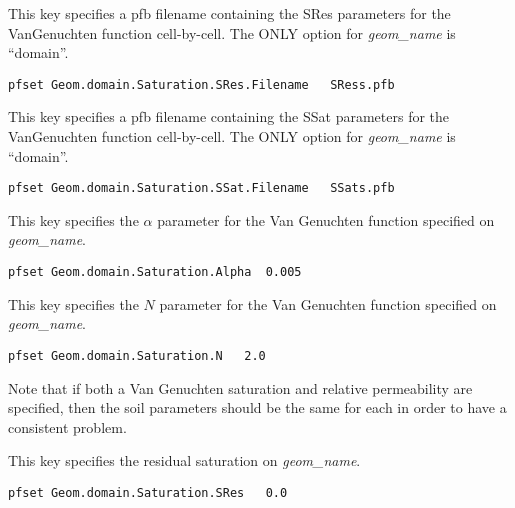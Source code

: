 {This key specifies a pfb filename containing the SRes parameters for the
VanGenuchten function cell-by-cell.  The ONLY option for {\em geom\_name} is
``domain''.}
\begin{display}\begin{verbatim}
pfset Geom.domain.Saturation.SRes.Filename   SRess.pfb
\end{verbatim}\end{display}

{This key specifies a pfb filename containing the SSat parameters for the
VanGenuchten function cell-by-cell.  The ONLY option for {\em geom\_name} is
``domain''.}
\begin{display}\begin{verbatim}
pfset Geom.domain.Saturation.SSat.Filename   SSats.pfb
\end{verbatim}\end{display}

{This key specifies the $\alpha$ parameter for the Van Genuchten function
specified on {\em geom\_name}.
}
\begin{display}\begin{verbatim}
pfset Geom.domain.Saturation.Alpha  0.005
\end{verbatim}\end{display}

{This key specifies the $N$ parameter for the Van Genuchten function specified
on {\em geom\_name}.
}
\begin{display}\begin{verbatim}
pfset Geom.domain.Saturation.N   2.0
\end{verbatim}\end{display}

Note that if both a Van Genuchten saturation and relative permeability are
specified, then the soil parameters should be the same for each in order
to have a consistent problem.

{This key specifies the residual saturation on {\em geom\_name}.
}
\begin{display}\begin{verbatim}
pfset Geom.domain.Saturation.SRes   0.0
\end{verbatim}\end{display}

